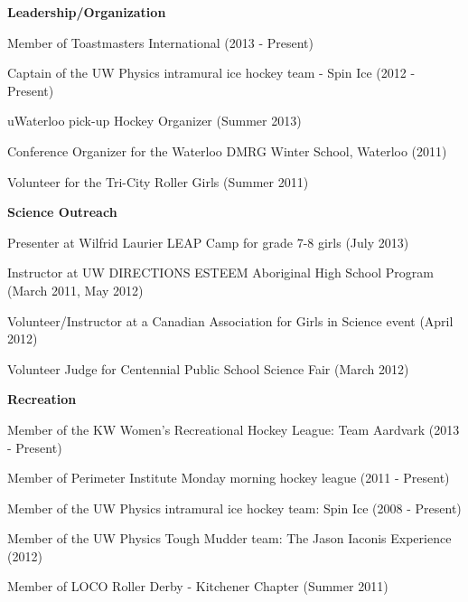 \documentclass[letterpaper]{article}
\renewenvironment{itemize}{
  \begin{list}{}{
    \setlength{\leftmargin}{1.5em}
  }
}{
  \end{list}
}
\begin{document}
\begin{itemize}


\item {\bf Leadership/Organization} 

\begin{itemize}
\item Member of Toastmasters International (2013 - Present)
\item Captain of the UW Physics intramural ice hockey team - Spin Ice (2012 - Present)
\item uWaterloo pick-up Hockey Organizer (Summer 2013)
\item Conference Organizer for the Waterloo DMRG Winter School, Waterloo (2011)
\item Volunteer for the Tri-City Roller Girls (Summer 2011)

\end{itemize}
	
\item {\bf Science Outreach} 
	\begin{itemize}
	
	\item Presenter at Wilfrid Laurier LEAP Camp for grade 7-8 girls (July 2013)
	\item Instructor at UW DIRECTIONS ESTEEM Aboriginal High School Program (March 2011, May 2012)
	\item Volunteer/Instructor at a Canadian Association for Girls in Science event (April 2012)
	\item Volunteer Judge for Centennial Public School Science Fair (March 2012)
	\end{itemize}

\item {\bf Recreation}
\begin{itemize}

\item Member of the KW Women's Recreational Hockey League: Team Aardvark (2013 - Present)
\item Member of Perimeter Institute Monday morning hockey league (2011 - Present)
\item Member of the UW Physics intramural ice hockey team: Spin Ice (2008 - Present)
\item Member of the UW Physics Tough Mudder team: The Jason Iaconis Experience (2012)
\item Member of LOCO Roller Derby - Kitchener Chapter (Summer 2011)
\end{itemize}

\end{itemize}
\end{document}
